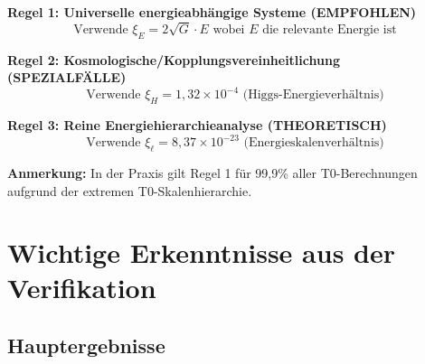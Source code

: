 	\begin{tcolorbox}[colback=blue!5!white,colframe=blue!75!black,title=Anwendungsregeln für $\xi$-Parameter (Reine Energie)]
		\textbf{Regel 1: Universelle energieabhängige Systeme (EMPFOHLEN)}
		\begin{equation}
			\text{Verwende } \xi_E = 2\sqrt{G} \cdot E \text{ wobei } E \text{ die relevante Energie ist}
		\end{equation}
		
		\textbf{Regel 2: Kosmologische/Kopplungsvereinheitlichung (SPEZIALFÄLLE)}
		\begin{equation}
			\text{Verwende } \xi_H = 1,32 \times 10^{-4} \text{ (Higgs-Energieverhältnis)}
		\end{equation}
		
		\textbf{Regel 3: Reine Energiehierarchieanalyse (THEORETISCH)}
		\begin{equation}
			\text{Verwende } \xi_\ell = 8,37 \times 10^{-23} \text{ (Energieskalenverhältnis)}
		\end{equation}
		
		\textbf{Anmerkung:} In der Praxis gilt Regel 1 für 99,9\% aller T0-Berechnungen aufgrund der extremen T0-Skalenhierarchie.
	\end{tcolorbox}
	
	\section{Wichtige Erkenntnisse aus der Verifikation}
	
	\subsection{Hauptergebnisse}
	
